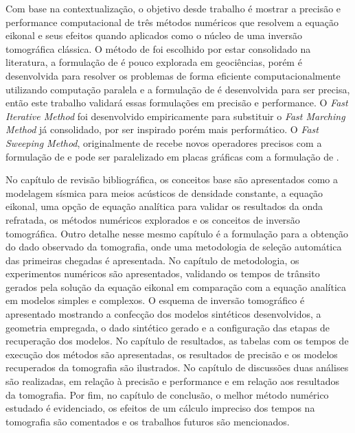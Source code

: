 Com base na contextualização, o objetivo desde trabalho é mostrar a precisão e performance computacional de três métodos numéricos que resolvem a equação eikonal e seus efeitos quando aplicados como o núcleo de uma inversão tomográfica clássica. O método de  foi escolhido por estar consolidado na literatura, a formulação de  é pouco explorada em geociências, porém é desenvolvida para resolver os problemas de forma eficiente computacionalmente utilizando computação paralela e a formulação de  é desenvolvida para ser precisa, então este trabalho validará essas formulações em precisão e performance. O \textit{Fast Iterative Method} \cite{jeong2008fast} foi desenvolvido empiricamente para substituir o \textit{Fast Marching Method} \cite{sethian19993} já consolidado, por ser inspirado porém mais performático. O \textit{Fast Sweeping Method}, originalmente de  recebe novos operadores precisos com a formulação de  e pode ser paralelizado em placas gráficas com a formulação de .
 
No capítulo de revisão bibliográfica, os conceitos base são apresentados como a modelagem sísmica para meios acústicos de densidade constante, a equação eikonal, uma opção de equação analítica para validar os resultados da onda refratada, os métodos numéricos explorados e os conceitos de inversão tomográfica. Outro detalhe nesse mesmo capítulo é a formulação para a obtenção do dado observado da tomografia, onde uma metodologia de seleção automática das primeiras chegadas é apresentada. No capítulo de metodologia, os experimentos numéricos são apresentados, validando os tempos de trânsito gerados pela solução da equação eikonal em comparação com a equação analítica em modelos simples e complexos. O esquema de inversão tomográfico é apresentado mostrando a confecção dos modelos sintéticos desenvolvidos, a geometria empregada, o dado sintético gerado e a configuração das etapas de recuperação dos modelos. No capítulo de resultados, as tabelas com os tempos de execução dos métodos são apresentadas, os resultados de precisão e os modelos recuperados da tomografia são ilustrados. No capítulo de discussões duas análises são realizadas, em relação à precisão e performance e em relação aos resultados da tomografia. Por fim, no capítulo de conclusão, o melhor método numérico estudado é evidenciado, os efeitos de um cálculo impreciso dos tempos na tomografia são comentados e os trabalhos futuros são mencionados.

